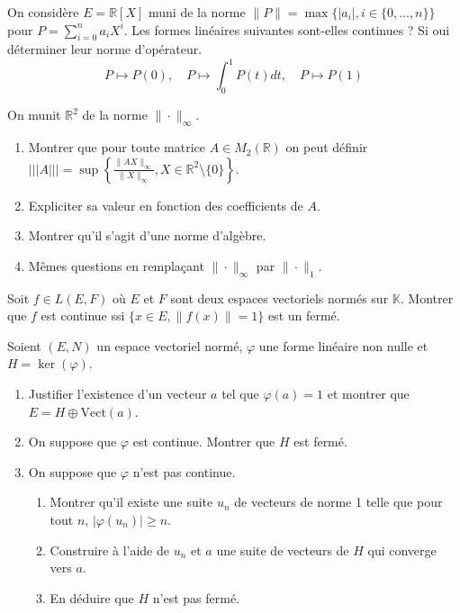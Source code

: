 \begin{exercice}
On considère $E=\mathbb{R}[X]$ muni de la norme $\|P\| = \max \{|a_{i}|, i \in \{0,\dots,n\}\}$ pour $P = \sum_{i=0}^{n} a_{i} X^{i}$.
Les formes linéaires suivantes sont-elles continues ? Si oui déterminer leur norme d'opérateur.
$$ P \mapsto P(0), \quad P \mapsto \int_{0}^{1} P(t) dt, \quad P \mapsto P(1) $$
\end{exercice}

\begin{exercice}
On munit $\mathbb{R}^{2}$ de la norme $\|\cdot\|_{\infty}$.
\begin{enumerate}
    \item Montrer que pour toute matrice $A \in M_{2}(\mathbb{R})$ on peut définir $|||A||| = \sup \left\{ \frac{\|AX\|_{\infty}}{\|X\|_{\infty}}, X \in \mathbb{R}^{2} \setminus \{0\} \right\}$.
    \item Expliciter sa valeur en fonction des coefficients de $A$.
    \item Montrer qu'il s'agit d'une norme d'algèbre.
    \item Mêmes questions en remplaçant $\|\cdot\|_{\infty}$ par $\|\cdot\|_{1}$.
\end{enumerate}
\end{exercice}

\begin{exercice}
Soit $f \in L(E,F)$ où $E$ et $F$ sont deux espaces vectoriels normés sur $\mathbb{K}$.
Montrer que $f$ est continue ssi $\{x \in E, \|f(x)\| = 1\}$ est un fermé.
\end{exercice}

\begin{exercice}
Soient $(E, N)$ un espace vectoriel normé, $\varphi$ une forme linéaire non nulle et $H = \ker(\varphi)$.
\begin{enumerate}
    \item Justifier l'existence d'un vecteur $a$ tel que $\varphi(a)=1$ et montrer que $E = H \oplus \text{Vect}(a)$.
    \item On suppose que $\varphi$ est continue. Montrer que $H$ est fermé.
    \item On suppose que $\varphi$ n'est pas continue.
    \begin{enumerate}
        \item Montrer qu'il existe une suite $u_{n}$ de vecteurs de norme 1 telle que pour tout $n$, $|\varphi(u_{n})| \ge n$.
        \item Construire à l'aide de $u_{n}$ et $a$ une suite de vecteurs de $H$ qui converge vers $a$.
        \item En déduire que $H$ n'est pas fermé.
    \end{enumerate}
\end{enumerate}
\end{exercice}


